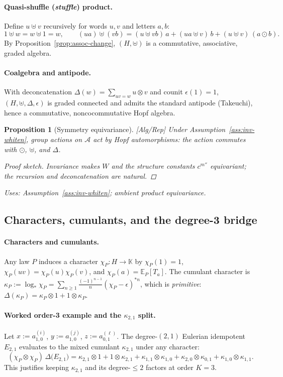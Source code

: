 \documentclass[10pt]{article}
\newcommand{\uses}[1]{\par\smallskip\noindent\textit{Uses: }#1\par\smallskip}
\newenvironment{proofsketch}{\begin{proof}[Proof sketch]}{\end{proof}}
\newtheorem{proposition}{Proposition}
\begin{document}
\paragraph{Quasi-shuffle (\emph{stuffle}) product.}
Define $u\uplus v$ recursively for words $u,v$ and letters $a,b$:
\[
1\uplus w=w\uplus 1=w,\qquad
(ua)\uplus (vb)=(u\uplus vb)\,a+(ua\uplus v)\,b+(u\uplus v)\,(a\odot b).
\]
By Proposition~\ref{prop:assoc-change}, $(H,\uplus)$ is a commutative, associative, graded algebra.

\paragraph{Coalgebra and antipode.}
With deconcatenation $\Delta(w)=\sum_{uv=w}u\otimes v$ and counit $\epsilon(1)=1$, $(H,\uplus,\Delta,\epsilon)$ is graded connected and admits the standard antipode (Takeuchi), hence a commutative, noncocommutative Hopf algebra.

\begin{proposition}[Symmetry equivariance]\label{prop:equivariance}
\emph{[\textup{Alg/Rep}]}
Under Assumption~\ref{ass:inv-whiten}, group actions on $\mathcal A$ act by Hopf automorphisms: the action commutes with $\odot$, $\uplus$, and $\Delta$.
\begin{proofsketch}
Invariance makes $W$ and the structure constants $c^{m''}$ equivariant; the recursion and deconcatenation are natural.
\end{proofsketch}
\uses{Assumption~\ref{ass:inv-whiten}; ambient product equivariance.}
\end{proposition}

\subsection{Characters, cumulants, and the degree-3 bridge}

\paragraph{Characters and cumulants.}
Any law $P$ induces a character $\chi_P:H\to\mathbb K$ by $\chi_P(1)=1$, $\chi_P(uv)=\chi_P(u)\chi_P(v)$, and $\chi_P(a)=\mathbb E_P[T_a]$. The cumulant character is $\kappa_P:=\log_*\chi_P=\sum_{n\ge1}\frac{(-1)^{n-1}}{n}(\chi_P-\epsilon)^{*n}$, which is \emph{primitive}: $\Delta(\kappa_P)=\kappa_P\otimes 1+1\otimes \kappa_P$.

\paragraph{Worked order-3 example and the $\kappa_{2,1}$ split.}
Let $x:=a^{(i)}_{1,0}$, $y:=a^{(j)}_{1,0}$, $z:=a^{(\ell)}_{0,1}$. The degree-$(2,1)$ Eulerian idempotent $E_{2,1}$ evaluates to the mixed cumulant $\kappa_{2,1}$ under any character:
\[
(\chi_P\otimes\chi_P)\,\Delta\!\big(E_{2,1}\big)
=\kappa_{2,1}\otimes 1+1\otimes \kappa_{2,1}+\kappa_{1,1}\otimes \kappa_{1,0}+\kappa_{2,0}\otimes \kappa_{0,1}+\kappa_{1,0}\otimes \kappa_{1,1}.
\]
This justifies keeping $\kappa_{2,1}$ and its degree-$\le2$ factors at order $K=3$.
\end{document}
